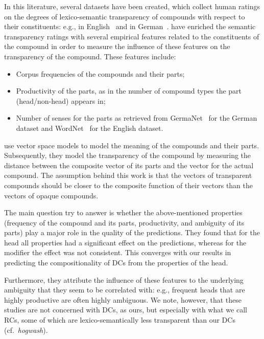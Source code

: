 \documentclass[output=paper]{langsci/langscibook}
\begin{document}
 {In this literature, several datasets have been created, which collect human ratings on the degrees of lexico-semantic transparency of compounds with respect to their constituents: e.g., in English~\citep{Reddy:2011,Juhaszetal:2015} and in German~\citep{SchulteImWaldeEtAl:16a}.} 
\cite{SchulteImWaldeEtAl:16a} have enriched the semantic transparency ratings with several empirical features related to the  {constituents} of the compound in order to measure the influence of these features on the  {transparency} of the compound. These features include:
\begin{itemize}
\item Corpus frequencies of the compounds and their parts;
\item Productivity of the parts, as in the number of compound types the part (head/non-head) appears in;
\item Number of senses for the parts as retrieved from GermaNet~\citep{hamp:97,heinrich:10} for the German dataset and WordNet~\citep{fellbaum:98} for the English dataset.
\end{itemize}

\cite{SchulteImWaldeEtAl:16} use vector space models to model the meaning of the compounds and their parts. Subsequently, they model the  {transparency} of the compound by measuring the distance between the composite vector of its parts and the vector for the actual compound. The assumption behind this work is that the vectors of  {transparent} compounds should be closer to the composite function of their vectors than the vectors of  {opaque} compounds. 

The main question \cite{SchulteImWaldeEtAl:16} try to answer  
is whether the above-mentioned properties (frequency of the compound and its parts, productivity, and ambiguity of its parts) play a major role in the  quality of the predictions. They found that for the head all properties had a significant effect on the predictions, whereas for the modifier the effect was not consistent. This converges with our results in predicting the compositionality of DCs from the properties of the head.

Furthermore, they attribute the influence of these features to the underlying  ambiguity that they seem to be correlated with: e.g., frequent heads that are highly productive are often highly ambiguous.  {We note, however, that these studies are not  concerned with DCs, as ours, but especially with what we call RCs, some of which are lexico-semantically less transparent than our DCs (cf.~\textit{hogwash}).}
\end{document}
